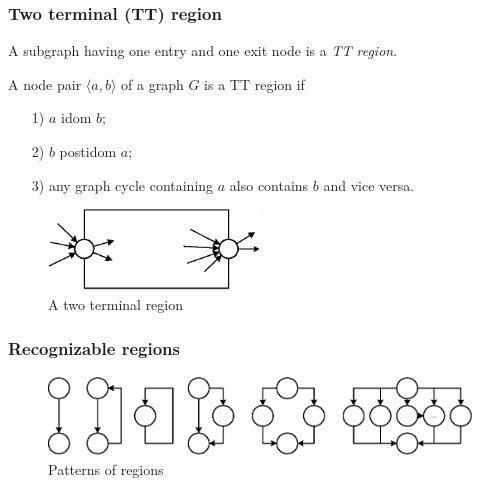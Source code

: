 \documentclass[aspectratio=169]{beamer}
\begin{document}

\begin{frame}
\frametitle{Two terminal (TT) region}

\newtheorem{TT}{Definition}[section]
\begin{Def}
A subgraph having one entry and one exit node is a \emph{TT region}.

A node pair $\langle a, b\rangle$ of a graph $G$ is a TT region if
	\begin{enumerate}
		\item[1)]
			$a$ idom $b$;
		\item[2)]
			$b$ postidom $a$;
		\item[3)]
			any graph cycle containing $a$ also contains $b$ and vice versa.
	\end{enumerate}
\end{Def}


\begin{figure}[htbp]
	\centering
		\includegraphics[width=0.5\textwidth]{Pic/TTRegion.eps}
	\caption{A two terminal region}
	\label{fig:TTRegion}
\end{figure}

\end{frame}


\begin{frame}
\frametitle{Recognizable regions}
\begin{figure}[htbp]
	\centering
		\includegraphics[width=1\textwidth]{Pic/Reg.eps}
	\caption{Patterns of regions}
	\label{fig:Regions}
\end{figure}
\end{frame}
\end{document}
